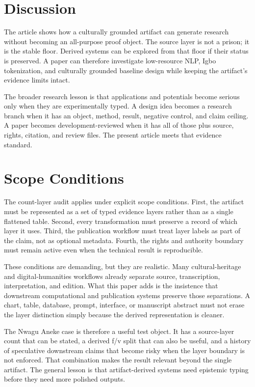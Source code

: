 \documentclass[sigconf,nonacm]{acmart}
\begin{document}
\section{Discussion}
The article shows how a culturally grounded artifact can generate research
without becoming an all-purpose proof object. The source layer is not a prison;
it is the stable floor. Derived systems can be explored from that floor if their
status is preserved. A paper can therefore investigate low-resource NLP, Igbo tokenization, and culturally grounded baseline design while keeping the
artifact's evidence limits intact.

The broader research lesson is that applications and potentials become serious
only when they are experimentally typed. A design idea becomes a research branch
when it has an object, method, result, negative control, and claim ceiling. A
paper becomes development-reviewed when it has all of those plus source, rights,
citation, and review files. The present article meets that evidence standard.


\section{Scope Conditions}
The count-layer audit applies under explicit scope conditions. First, the artifact must be
represented as a set of typed evidence layers rather than as a single flattened
table. Second, every transformation must preserve a record of which layer it
uses. Third, the publication workflow must treat layer labels as part of the
claim, not as optional metadata. Fourth, the rights and authority boundary must
remain active even when the technical result is reproducible.

These conditions are demanding, but they are realistic. Many cultural-heritage
and digital-humanities workflows already separate source, transcription,
interpretation, and edition. What this paper adds is the insistence that
downstream computational and publication systems preserve those separations. A
chart, table, database, prompt, interface, or manuscript abstract must not erase
the layer distinction simply because the derived representation is cleaner.

The Nwagu Aneke case is therefore a useful test object. It has a source-layer
count that can be stated, a derived f/v split that can also be useful, and a
history of speculative downstream claims that become risky when the layer
boundary is not enforced. That combination makes the result relevant beyond the
single artifact. The general lesson is that artifact-derived systems need
epistemic typing before they need more polished outputs.
\end{document}

